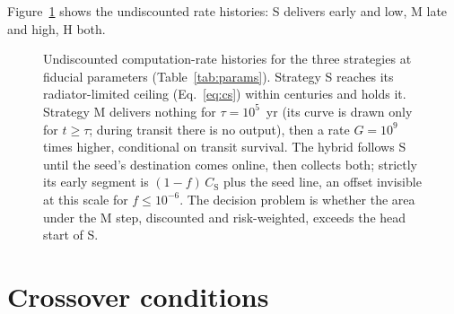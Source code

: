 \documentclass[11pt]{article}
\begin{document}
Figure~\ref{fig:kernels} shows the undiscounted rate histories: S delivers early and low, M late and high, H both.

\begin{figure}[tbp]
\centering
{}
\caption{Undiscounted computation-rate histories for the three strategies at fiducial parameters (Table~\ref{tab:params}). Strategy S reaches its radiator-limited ceiling (Eq.~\ref{eq:cs}) within centuries and holds it. Strategy M delivers nothing for $\tau = 10^{5}$~yr (its curve is drawn only for $t \geq \tau$; during transit there is no output), then a rate $G = 10^{9}$ times higher, conditional on transit survival. The hybrid follows S until the seed's destination comes online, then collects both; strictly its early segment is $(1-f)\,C_{\mathrm S}$ plus the seed line, an offset invisible at this scale for $f \leq 10^{-6}$. The decision problem is whether the area under the M step, discounted and risk-weighted, exceeds the head start of S.}
\label{fig:kernels}
\end{figure}

\section{Crossover conditions}
\label{sec:crossover}
\end{document}

